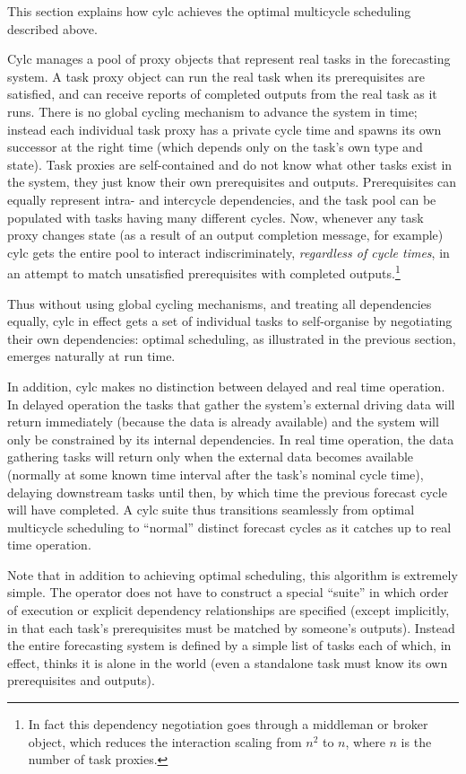 \documentclass[11pt,a4paper]{article}
\begin{document}
This section explains how cylc achieves the optimal multicycle
scheduling described above. 

Cylc manages a pool of proxy objects that represent real tasks in the
forecasting system. A task proxy object can run the real task when its
prerequisites are satisfied, and can receive reports of completed
outputs from the real task as it runs. There is no global cycling
mechanism to advance the system in time; instead each individual task
proxy has a private cycle time and spawns its own successor at the right
time (which depends only on the task's own type and state). Task proxies
are self-contained and do not know what other tasks exist in the system,
they just know their own prerequisites and outputs.  Prerequisites can
equally represent intra- and intercycle dependencies, and the task pool
can be populated with tasks having many different cycles. Now,
whenever any task proxy changes state (as a result of an output
completion message, for example) cylc gets the entire pool to interact
indiscriminately, {\em regardless of cycle times}, in an attempt to
match unsatisfied prerequisites with completed outputs.\footnote{In fact
this dependency negotiation goes through a middleman or broker object,
which reduces the interaction scaling from $n^2$ to $n$, where $n$ is
the number of task proxies.} 

Thus without using global cycling mechanisms, and treating all
dependencies equally, cylc in effect gets a set of individual tasks to
self-organise by negotiating their own dependencies: optimal scheduling,
as illustrated in the previous section, emerges naturally at run time.

In addition, cylc makes no distinction between delayed and real time
operation. In delayed operation the tasks that gather the system's
external driving data will return immediately (because the data is
already available) and the system will only be constrained by its
internal dependencies. In real time operation, the data gathering tasks
will return only when the external data becomes available (normally at
some known time interval after the task's nominal cycle time), delaying
downstream tasks until then, by which time the previous forecast cycle
will have completed. A cylc suite thus transitions seamlessly from
optimal multicycle scheduling to ``normal'' distinct forecast cycles as
it catches up to real time operation.

Note that in addition to achieving optimal scheduling, this algorithm is
extremely simple. The operator does not have to construct a special
``suite'' in which order of execution or explicit dependency
relationships are specified (except implicitly, in that each task's
prerequisites must be matched by someone's outputs). Instead the entire
forecasting system is defined by a simple list of tasks each of which,
in effect, thinks it is alone in the world (even a standalone task must
know its own prerequisites and outputs).
\end{document}
